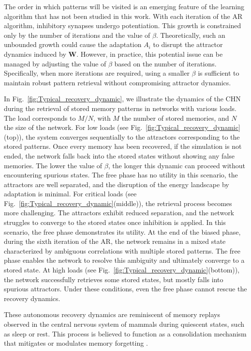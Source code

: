 \documentclass[10pt,letterpaper]{article}
\begin{document}
The order in which patterns will be visited is an emerging feature of the learning algorithm that has not been studied in this work. With each iteration of the AR algorithm, inhibitory synapses undergo potentiation. This growth is constrained only by the number of iterations and the value of $\beta$. Theoretically, such an unbounded growth could cause the adaptation $A_i$ to disrupt the attractor dynamics induced by $\mathbf{W}$. However, in practice, this potential issue can be managed by adjusting the value of $\beta$ based on the number of iterations. Specifically, when more iterations are required, using a smaller $\beta$ is sufficient to maintain robust pattern retrieval without compromising attractor dynamics.

In Fig.~\ref{fig:Typical_recovery_dynamic}, we illustrate the dynamics of the CHN during the retrieval of stored memory patterns in networks with various loads. The load corresponds to $M/N$, with $M$ the number of stored memories, and $N$ the size of the network. For low loads (see Fig.~\ref{fig:Typical_recovery_dynamic}(top)), the system converges sequentially to the attractors corresponding to the stored patterns. Once every memory has been recovered, if the simulation is not ended, the network falls back into the stored states without showing any false memories. The lower the value of $\beta$, the longer this dynamic can proceed without encountering spurious states. The free phase has no utility in this scenario, the attractors are well separated, and the disruption of the energy landscape by adaptation is minimal. For critical loads (see Fig.~\ref{fig:Typical_recovery_dynamic}(middle)), the retrieval process becomes more challenging. The attractors exhibit reduced separation, and the network struggles to converge to the stored states once inhibition is applied. In this scenario, the free phase demonstrates its utility. At the end of the biased phase, during the sixth iteration of the AR, the network remains in a mixed state characterized by ambiguous correlations with multiple stored patterns. The free phase enables the network to resolve this ambiguity and ultimately converge to a stored state. At high loads (see Fig.~\ref{fig:Typical_recovery_dynamic}(bottom)), the network successfully retrieves some stored states, but mostly falls into spurious attractors. Under these conditions, even the free phase cannot rescue the recovery dynamics.

These autonomous recovery dynamics are reminiscent of memory replays observed in the central nervous system of mammals during quiescent states, such as sleep or rest.
This process is believed to function as a consolidation mechanism that mitigates or modulates memory forgetting
\cite{robins_catastrophic_1995,louie_temporally_2001,peyrache_replay_2009,fauth_self-organized_2019,tononi_sleep_2014}.
\end{document}
